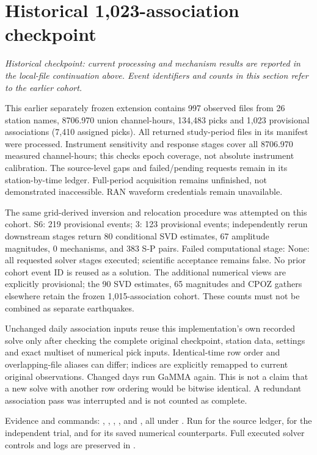 \section{Historical 1,023-association checkpoint}
\noindent\textit{Historical checkpoint: current processing and mechanism results are reported in the local-file continuation above. Event identifiers and counts in this section refer to the earlier cohort.}\par
This earlier separately frozen extension contains 997 observed files from 26 station names, 8706.970 union channel-hours, 134,483 picks and 1,023 provisional associations (7,410 assigned picks). All returned study-period files in its manifest were processed. Instrument sensitivity and response stages cover all 8706.970 measured channel-hours; this checks epoch coverage, not absolute instrument calibration. The source-level gaps and failed/pending requests remain in its station-by-time ledger. Full-period acquisition remains unfinished, not demonstrated inaccessible. RAN waveform credentials remain unavailable.

The same grid-derived inversion and relocation procedure was attempted on this cohort. S6: 219 provisional events; 3: 123 provisional events; independently rerun downstream stages return 80 conditional SVD estimates, 67 amplitude magnitudes, 0 mechanisms, and 383 S-P pairs. Failed computational stage: None: all requested solver stages executed; scientific acceptance remains false. No prior cohort event ID is reused as a solution. The additional numerical views are explicitly provisional; the 90 SVD estimates, 65 magnitudes and CPOZ gathers elsewhere retain the frozen 1,015-association cohort. These counts must not be combined as separate earthquakes.

Unchanged daily association inputs reuse this implementation's own recorded solve only after checking the complete original checkpoint, station data, settings and exact multiset of numerical pick inputs. Identical-time row order and overlapping-file aliases can differ; indices are explicitly remapped to current original observations. Changed days run GaMMA again. This is not a claim that a new solve with another row ordering would be bitwise identical. A redundant association pass was interrupted and is not counted as complete.

\begingroup\small\raggedright Evidence and commands: , , , ,  and , all under . Run  for the source ledger,  for the independent trial, and  for its saved numerical counterparts. Full executed solver controls and logs are preserved in .
\par\endgroup

